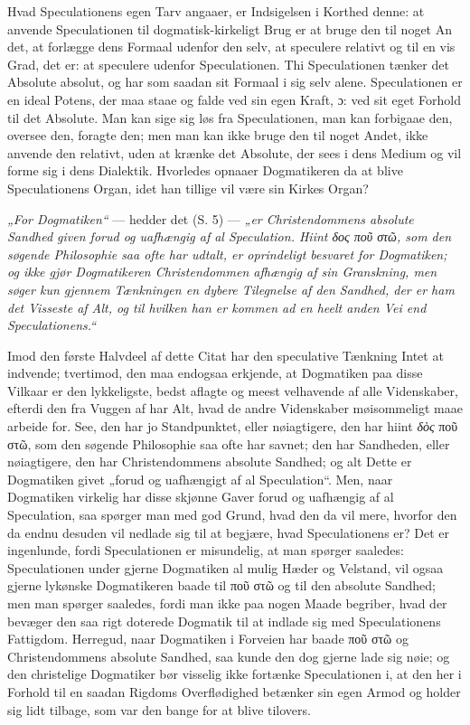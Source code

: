 Hvad Speculationens egen Tarv angaaer, er Indsigelsen i Korthed
denne: at anvende Speculationen til dogmatisk-kirkeligt Brug er at
bruge den til noget An%
det, at forlægge dens Formaal udenfor den selv, at speculere
relativt og til en vis Grad, det er: at speculere udenfor
Speculationen. Thi Speculationen tænker det Absolute absolut, og
har som saadan sit Formaal i sig selv alene. Speculationen er en
ideal Potens, der maa staae og falde ved sin egen Kraft, ɔ: ved
sit eget Forhold til det Absolute. Man kan sige sig løs fra
Speculationen, man kan forbigaae den, oversee den, foragte den;
men man kan ikke bruge den til noget Andet, ikke anvende den
relativt, uden at krænke det Absolute, der sees i dens Medium og
vil forme sig i dens Dialektik. Hvorledes opnaaer Dogmatikeren da
at blive Speculationens Organ, idet han tillige vil være sin
Kirkes Organ?

\emph{„For Dogmatiken“} --- hedder det (S. 5) --- \emph{„er
Christendommens absolute Sandhed given forud og uafhængig af al
Speculation. Hiint \textit{δος} ποῦ στῶ, som den søgende
Philosophie saa ofte har udtalt, er oprindeligt besvaret for
Dogmatiken; og ikke gjør Dogmatikeren Christendommen afhængig af
sin Granskning, men søger kun gjennem Tænkningen en dybere
Tilegnelse af den Sandhed, der er ham det Visseste af Alt, og til
hvilken han er kommen ad en heelt anden Vei end Speculationens.“}

Imod den første Halvdeel af dette Citat har den speculative
Tænkning Intet at indvende; tvertimod, den
 maa endogsaa erkjende, at Dogmatiken paa disse Vilkaar er den
lykkeligste, bedst aflagte og meest velhavende af alle
Videnskaber, efterdi den fra Vuggen af har Alt, hvad de andre
Videnskaber møisommeligt maae arbeide for. See, den har jo
Standpunktet, eller nøiagtigere, den har hiint \textit{δὸς} ποῦ
στῶ, som den søgende Philosophie saa ofte har savnet; den har
Sandheden, eller nøiagtigere, den har Christendommens absolute
Sandhed; og alt Dette er Dogmatiken givet „forud og uafhængigt af
al Speculation“. Men, naar Dogmatiken virkelig har disse skjønne
Gaver forud og uafhængig af al Speculation, saa spørger man med
god Grund, hvad den da vil mere, hvorfor den da endnu desuden vil
nedlade sig til at begjære, hvad Speculationens er? Det er
ingenlunde, fordi Speculationen er misundelig, at man spørger
saaledes: Speculationen under gjerne Dogmatiken al mulig Hæder og
Velstand, vil ogsaa gjerne lykønske Dogmatikeren baade til ποῦ στῶ
og til den absolute Sandhed; men man spørger saaledes, fordi man
ikke paa nogen Maade begriber, hvad der bevæger den saa rigt
doterede
{} Dogmatik til at indlade sig med Speculationens Fattigdom.
Herregud, naar Dogmatiken i Forveien har baade ποῦ στῶ og
Christendommens absolute Sandhed, saa kunde den dog gjerne lade
sig nøie; og den christelige Dogmatiker bør visselig ikke
fortænke Speculationen i, at den her i Forhold til en saadan
Rigdoms Overflødighed betænker sin egen Armod og holder sig lidt
tilbage, som var den bange for at blive tilovers.

